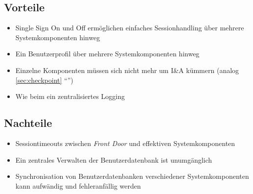 \subsection*{Vorteile}
\begin{itemize}
	\item Single Sign On und Off ermöglichen einfaches Sessionhandling über mehrere Systemkomponenten hinweg
	\item Ein Benutzerprofil über mehrere Systemkomponenten hinweg
	\item Einzelne Komponenten müssen sich nicht mehr um I\&A kümmern (analog \ref{sec:checkpoint} ``'')
	\item Wie beim  ein zentralisiertes Logging
\end{itemize}

\subsection*{Nachteile}
\begin{itemize}
	\item Sessiontimeouts zwischen \emph{Front Door} und effektiven Systemkomponenten
	\item Ein zentrales Verwalten der Benutzerdatenbank ist unumgänglich
	\item Synchronisation von Benutzerdatenbanken verschiedener Systemkomponenten kann aufwändig und fehleranfällig werden
\end{itemize}
